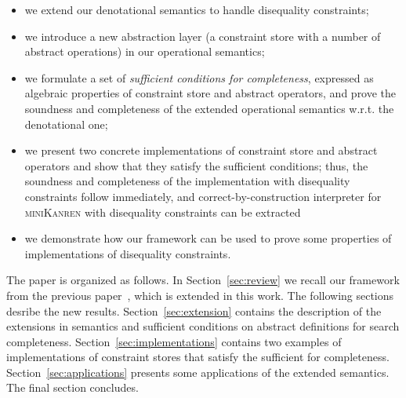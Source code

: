 \begin{itemize}
\item we extend our denotational semantics to handle disequality constraints;
\item we introduce a new abstraction layer (a constraint store with a number of abstract operations) in our operational semantics;
\item we formulate a set of \emph{sufficient conditions for completeness}, expressed as algebraic properties of constraint store and
  abstract operators, and prove the soundness and completeness of the extended operational semantics w.r.t. the denotational one;
\item we present two concrete implementations of constraint store and abstract operators and show that they satisfy the
  sufficient conditions; thus, the soundness and completeness of the implementation with disequality constraints follow
  immediately, and correct-by-construction interpreter for \textsc{miniKanren} with disequality constraints
  can be extracted
\item we demonstrate how our framework can be used to prove some properties of implementations of disequality constraints.
\end{itemize}

The paper is organized as follows. In Section~\ref{sec:review} we recall our framework from the previous paper~\cite{CertifiedSemantics}, which is extended in this work. The following sections desribe the new results. Section~\ref{sec:extension} contains the description of the extensions in semantics and sufficient conditions on abstract definitions for search completeness. Section~\ref{sec:implementations} contains two examples of implementations of constraint stores that satisfy the sufficient for completeness. Section~\ref{sec:applications} presents some applications of the extended semantics. The final section concludes.